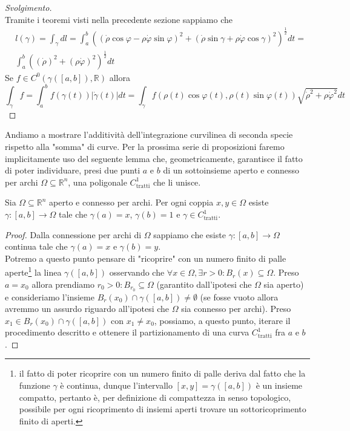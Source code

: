 \begin{proof}[Svolgimento] \hspace{1cm} \\
Tramite i teoremi visti nella precedente sezione sappiamo che
\begin{align*}
&l(\gamma) = \int_\gamma dl = \int_a^b ( (\dot{\rho} \cos{\varphi} - \rho \dot{\varphi} \sin{\varphi})^ 2 + (\dot{\rho} \sin{\gamma} + \rho \dot{\varphi} \cos{\gamma})^2)^{\frac{1}{2}} dt = \\
&\int_a^b ((\dot{\rho})^2 + (\rho \dot{\varphi})^2)^{\frac{1}{2}}dt
\end{align*}
Se $f \in C^0(\gamma([a, b]), \mathbb{R})$ allora
$$
\int_\gamma f = \int_a^b f(\gamma(t))|\dot{\gamma}(t)|dt = \int_\gamma f(\rho(t) \cos{\varphi(t)}, \rho(t) \sin{\varphi(t)}) \sqrt{\dot{\rho}^2 + \rho \dot{\varphi}^2} dt
$$
\end{proof}
Andiamo a mostrare l'additività dell'integrazione curvilinea di seconda specie rispetto alla "somma" di curve.
Per la prossima serie di proposizioni faremo implicitamente uso del seguente lemma che, geometricamente, garantisce il fatto di poter individuare, presi due punti $a$ e $b$ di un sottoinsieme aperto e connesso per archi $\Omega \subseteq \mathbb{R}^n$, una poligonale $C^1_\text{tratti}$ che li unisce.
\begin{lemma}
	Sia $\Omega \subseteq \mathbb{R}^n$ aperto e connesso per archi. Per ogni coppia $x, y \in \Omega$ esiste $\gamma:[a, b] \to \Omega$ tale che $\gamma(a) = x$, $\gamma(b)=1$ e $\gamma \in C^1_\text{tratti}$.
\end{lemma}
\begin{proof}
	Dalla connessione per archi di $\Omega$ sappiamo che esiste $\gamma: [a, b] \to \Omega$ continua tale che $\gamma(a) = x$ e $\gamma(b) = y$. \\
	Potremo a questo punto pensare di "ricoprire" con un numero finito di palle aperte\footnote{il fatto di poter ricoprire con un numero finito di palle deriva dal fatto che la funzione $\gamma$ è continua, dunque l'intervallo $[x,y] = \gamma([a, b])$ è un insieme compatto, pertanto è, per definizione di compattezza in senso topologico, possibile per ogni ricoprimento di insiemi aperti trovare un sottoricoprimento finito di aperti.} la linea $\gamma([a, b])$ osservando che $\forall x \in \Omega, \exists r > 0: B_r(x) \subseteq \Omega$. Preso $a = x_0$ allora prendiamo $r_0 > 0: B_{r_0} \subseteq \Omega$ (garantito dall'ipotesi che $\Omega$ sia aperto) e consideriamo l'insieme
	$B_r(x_0) \cap \gamma([a, b]) \neq \emptyset$ (se fosse vuoto allora avremmo un assurdo riguardo all'ipotesi che $\Omega$ sia connesso per archi). Preso $x_1 \in B_r(x_0) \cap \gamma([a, b])$ con $x_1 \neq x_0$, possiamo, a questo punto, iterare il procedimento descritto e ottenere il partizionamento di una curva $C^1_\text{tratti}$ fra $a$ e $b$.
\end{proof}
